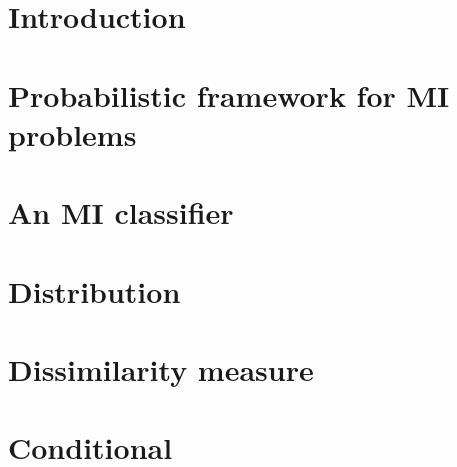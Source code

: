 \documentclass[preprint,12pt]{elsarticle}
\begin{document}
\newcommand{\cpos}{\text{\scriptsize{{\it POS}}}}
\newcommand{\cneg}{\text{\scriptsize{{\it NEG}}}}


\begin{frontmatter}







\end{frontmatter}

\clearpage

\section{Introduction} \label{sec:Introduction} 


\section{Probabilistic framework for MI problems} \label{sec:Probabilistic} 


% 

% 

\section{An MI classifier} \label{sec:Classifier}


\section{Distribution} \label{sec:Distribution}


\section{Dissimilarity measure} \label{sec:Dissimilarity}


\section{Conditional} \label{sec:Conditional}

\end{document}
